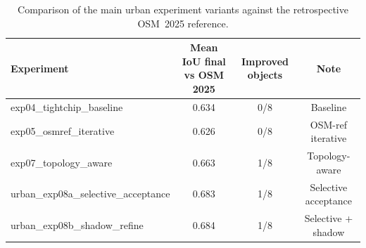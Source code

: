 \begin{table}[htbp]
\centering
\caption{Comparison of the main urban experiment variants against the retrospective OSM~2025 reference.}
\label{tab:urban_experiment_comparison}
\begin{tabular}{p{4.2cm}ccc}
\toprule
Experiment & Mean IoU final vs OSM 2025 & Improved objects & Note \\
\midrule
exp04\_tightchip\_baseline & 0.634 & 0/8 & Baseline \\
exp05\_osmref\_iterative & 0.626 & 0/8 & OSM-ref iterative \\
exp07\_topology\_aware & 0.663 & 1/8 & Topology-aware \\
urban\_exp08a\_selective\_acceptance & 0.683 & 1/8 & Selective acceptance \\
urban\_exp08b\_shadow\_refine & 0.684 & 1/8 & Selective + shadow \\
\bottomrule
\end{tabular}
\end{table}